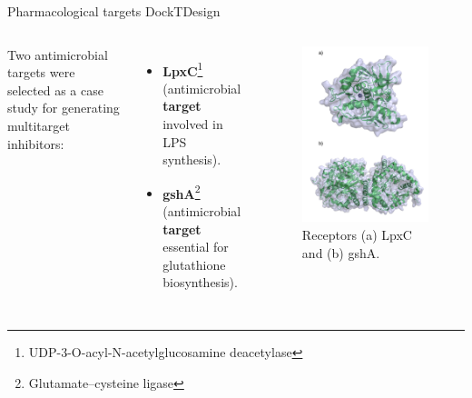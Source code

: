 \documentclass[aspectratio=169,xcolor=dvipsnames]{beamer}
\begin{document}
\begin{frame}{Pharmacological targets \hfill {\footnotesize \alert{DockTDesign}}}
    \begin{columns}[c]
        Two antimicrobial targets were selected as a case study for generating multitarget inhibitors:
        \begin{itemize}
            \item \textbf{LpxC}\footnote{UDP-3-O-acyl-N-acetylglucosamine deacetylase} (antimicrobial \textbf{target} involved in LPS synthesis).
            \item \textbf{gshA}\footnote{Glutamate–cysteine ligase} (antimicrobial \textbf{target} essential for glutathione biosynthesis).
        \end{itemize}
        \vspace{1em}

        \begin{figure}
            \centering
            \includegraphics[width=.55\linewidth]{imgs/lpxc-gsha-receptors.png}
            \caption{Receptors (a) LpxC and (b) gshA.}
        \end{figure}
    \end{columns}




\end{frame}
\end{document}
